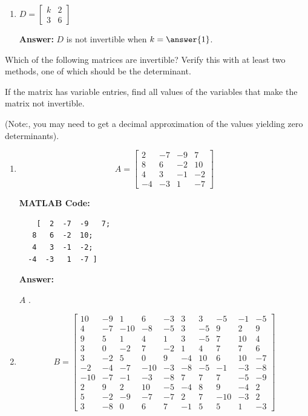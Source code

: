 \documentclass{ximera}
\begin{document}
\begin{example}
\begin{enumerate}
        \item $D = \begin{bmatrix} k & 2 \\ 3 & 6 \end{bmatrix}$

        \textbf{Answer:} $D$ is not invertible when $k = \answer{1}$.
    \end{enumerate}
\end{example}

\begin{example}\label{ex:invertible}
    Which of the following matrices are invertible? Verify this with at least two methods, one of which should be the determinant.

    If the matrix has variable entries, find all values of the variables that make the matrix not invertible.

    (Note:, you may need to get a decimal approximation of the values yielding zero determinants).

    \begin{enumerate}
        \item \[
        A=\begin{bmatrix}  
            2 & -7 & -9 & 7 \\  
            8 & 6 & -2 & 10 \\  
            4 & 3 & -1 & -2 \\  
            -4 & -3 & 1 & -7  
            \end{bmatrix}  
            \]

\textbf{MATLAB Code:}
\begin{verbatim}
    [  2  -7  -9   7;
   8   6  -2  10;
   4   3  -1  -2;
  -4  -3   1  -7 ]
\end{verbatim}


    \textbf{Answer:}

    $A$ . 

    \item \[
B=\begin{bmatrix}  
10 & -9 & 1 & 6 & -3 & 3 & 3 & -5 & -1 & -5 \\  
4 & -7 & -10 & -8 & -5 & 3 & -5 & 9 & 2 & 9 \\  
9 & 5 & 1 & 4 & 1 & 3 & -5 & 7 & 10 & 4 \\  
3 & 0 & -2 & 7 & -2 & 1 & 4 & 7 & 7 & 6 \\  
3 & -2 & 5 & 0 & 9 & -4 & 10 & 6 & 10 & -7 \\  
-2 & -4 & -7 & -10 & -3 & -8 & -5 & -1 & -3 & -8 \\  
-10 & -7 & -1 & -3 & -8 & 7 & 7 & 7 & -5 & -9 \\  
2 & 9 & 2 & 10 & -5 & -4 & 8 & 9 & -4 & 2 \\  
5 & -2 & -9 & -7 & -7 & 2 & 7 & -10 & -3 & 2 \\  
3 & -8 & 0 & 6 & 7 & -1 & 5 & 5 & 1 & -3  
\end{bmatrix}  
\]


\end{enumerate}
\end{example}
\end{document}
